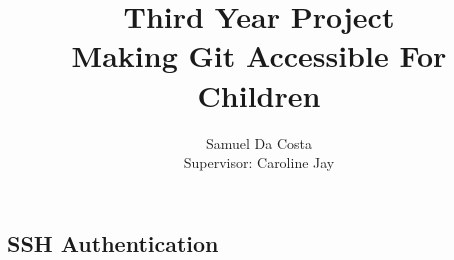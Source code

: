 \documentclass[a4paper]{report}
\begin{document}
\newcommand{\commit}[0]{\texttt{commit}}
\newcommand{\fig}[4]{

\begin{figure} 
    \centering
    \texttt{[image: \#1]}
    \caption{#2}
    \label{#3}
\end{figure}


}

\title{Third Year Project \\
\large Making Git Accessible For Children \\
}
\author{Samuel Da Costa\\
Supervisor: Caroline Jay}
\maketitle







\begin{appendices}

\chapter{SSH Authentication}\label{appendix_sshkeys}

\end{appendices}




\end{document}

